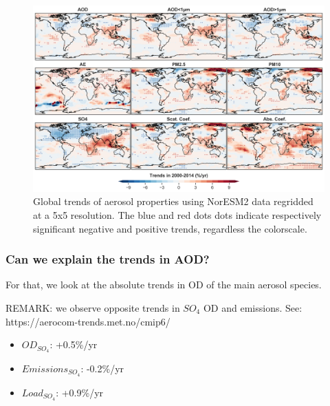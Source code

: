 \documentclass[journal abbreviation, manuscript]{copernicus}
\begin{document}
\begin{figure}[t]
 \includegraphics[width=16cm]{../scripts/figs/trends_map2.png}
 \caption{Global trends of aerosol properties using NorESM2 data regridded at a 5x5 resolution. The blue and red dots dots indicate respectively significant negative and positive trends, regardless the colorscale.}
 \label{mod_map_trends}
\end{figure}

\subsubsection{Can we explain the trends in AOD?}
For that,  we look at the absolute trends in OD of the main aerosol species.

REMARK: we observe opposite trends in $SO_{4}$ OD and emissions.
See: https://aerocom-trends.met.no/cmip6/
\begin{itemize}
 \item $OD_{SO_{4}}$: +0.5\%/yr
 \item $Emissions_{SO_{4}}$: -0.2\%/yr
 \item $Load_{SO_{4}}$: +0.9\%/yr
\end{itemize}

\end{document}
